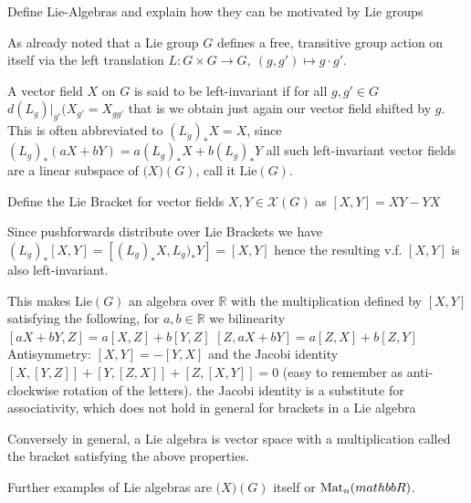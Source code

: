 Define Lie-Algebras and explain how they can be motivated by Lie groups

As already noted that a Lie group \( G \) defines a free, transitive group action on itself
via the left translation \( L : G \times G \to G,\ (g, g') \mapsto g\cdot g' \).

A vector field \( X \) on \( G \) is said to be left-invariant if for all \( g, g' \in G \)
\( d(L_g)|_{g'}(X_{g'} = X_{gg'} \)
that is we obtain just again our vector field shifted by \( g \). 
This is often abbreviated to \( (L_g)_{\ast}X = X \),
since \( (L_g)_{\ast}(aX + bY) = a(L_g)_{\ast}X + b(L_g)_{\ast}Y \) all such left-invariant vector fields
are a linear subspace of \( \mathcal(X)(G) \), call it \( \text{Lie}(G) \).

Define the Lie Bracket for vector fields \( X, Y \in \mathcal{X}(G) \) as 
\( [X, Y] = XY - YX \)

Since pushforwards distribute over Lie Brackets we have
\( (L_{g})_{\ast}[X, Y] = [(L_{g})_{\ast}X,L_{g})_{\ast}Y] = [X, Y]  \) hence the resulting v.f. \( [X, Y] \)
is also left-invariant.

This makes \( \text{Lie}(G) \) an algebra over \( \mathbb{R} \)
with the multiplication defined by \( [X, Y] \) satisfying the following,
for \( a, b \in \mathbb{R} \) we bilinearity
\([aX + bY, Z] = a[X, Z] + b[Y, Z]\)
\([Z, aX + bY] = a[Z, X] + b[Z, Y]\)
Antisymmetry:
\( [X, Y] = -[Y, X] \)
and the Jacobi identity
\( [X, [Y, Z]] + [Y, [Z, X]] + [Z, [X, Y]] = 0\)
(easy to remember as anti-clockwise rotation of the letters).
the Jacobi identity is a substitute for associativity, which does not hold
in general for brackets in a Lie algebra

Conversely in general, a Lie algebra is vector space with a multiplication called the bracket satisfying the above properties.

Further examples of Lie algebras are \( \mathcal(X)(G) \) itself or \( \text{Mat}_n(\\mathbb{R}) \).

